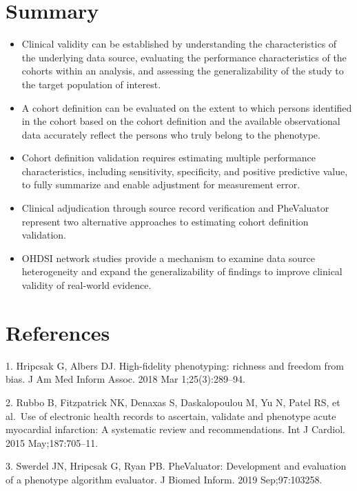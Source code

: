 \documentclass[
  letterpaper,
  paper=7in:10in,
  pagesize=pdftex,
  headinclude=on,
  footinclude=on,
  12pt]{scrbook}
\providecommand{\tightlist}{%
  \setlength{\itemsep}{0pt}\setlength{\parskip}{0pt}}\usepackage{longtable,booktabs,array}
\begin{document}
\section{Summary}\label{summary-1}

\begin{itemize}
\tightlist
\item
  Clinical validity can be established by understanding the
  characteristics of the underlying data source, evaluating the
  performance characteristics of the cohorts within an analysis, and
  assessing the generalizability of the study to the target population
  of interest.
\item
  A cohort definition can be evaluated on the extent to which persons
  identified in the cohort based on the cohort definition and the
  available observational data accurately reflect the persons who truly
  belong to the phenotype.
\item
  Cohort definition validation requires estimating multiple performance
  characteristics, including sensitivity, specificity, and positive
  predictive value, to fully summarize and enable adjustment for
  measurement error.
\item
  Clinical adjudication through source record verification and
  PheValuator represent two alternative approaches to estimating cohort
  definition validation.
\item
  OHDSI network studies provide a mechanism to examine data source
  heterogeneity and expand the generalizability of findings to improve
  clinical validity of real-world evidence.
\end{itemize}

\section{References}\label{references}

1. Hripcsak G, Albers DJ. High-fidelity phenotyping: richness and
freedom from bias. J Am Med Inform Assoc. 2018 Mar 1;25(3):289--94.

2. Rubbo B, Fitzpatrick NK, Denaxas S, Daskalopoulou M, Yu N, Patel RS,
et al.~Use of electronic health records to ascertain, validate and
phenotype acute myocardial infarction: A systematic review and
recommendations. Int J Cardiol. 2015 May;187:705--11.

3. Swerdel JN, Hripcsak G, Ryan PB. PheValuator: Development and
evaluation of a phenotype algorithm evaluator. J Biomed Inform. 2019
Sep;97:103258.
\end{document}
